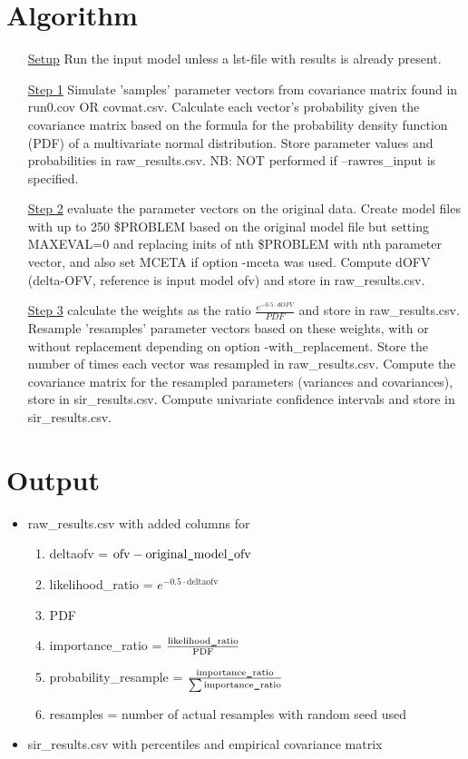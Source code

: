 \section{Algorithm}
\begin{itemize}
\item[\underline{Setup}] Run the input model unless a lst-file with results is already present.
\item[\underline{Step 1}] Simulate 'samples' parameter vectors from covariance matrix found in run0.cov OR covmat.csv. 
Calculate each vector’s probability given the covariance matrix based on the formula for the probability 
density function (PDF) of a multivariate normal distribution. Store parameter values and probabilities in raw\_results.csv.
NB: NOT performed if –rawres\_input is specified.
\item[\underline{Step 2}] evaluate the parameter vectors on the original data.
Create model files with up to 250 \$PROBLEM based on the original model file but setting MAXEVAL=0
and replacing inits of nth \$PROBLEM with nth parameter vector, and also set MCETA if option -mceta was used. Compute dOFV 
(delta-OFV, reference is input model ofv) and store in raw\_results.csv.
\item[\underline{Step 3}] calculate the weights as the ratio $\frac{e^{-0.5\cdot dOFV}}{PDF}$ and store in raw\_results.csv. 
Resample 'resamples' parameter vectors based on these weights, with or without replacement depending on option -with\_replacement. 
Store the number of times each vector was resampled in raw\_results.csv.
Compute the covariance matrix for the resampled parameters (variances and covariances), 
store in sir\_results.csv. 
Compute univariate confidence intervals and store in sir\_results.csv.
\end{itemize}

\section{Output}
\begin{itemize}
\item raw\_results.csv with added columns for
\begin{enumerate}
\item deltaofv = $\mathrm{ofv} - \mathrm{original}\mbox{\tt\string_}\mathrm{model}\mbox{\tt\string_}\mathrm{ofv}$
\item likelihood\_ratio = $e^{-0.5\cdot \mathrm{deltaofv}}$
\item PDF
\item importance\_ratio = $\frac{\mathrm{likelihood}\mbox{\tt\string_}\mathrm{ratio}}{\mathrm{PDF}}$
\item probability\_resample = $\frac{\mathrm{importance}\mbox{\tt\string_}\mathrm{ratio}}{\sum{\mathrm{importance}\mbox{\tt\string_}\mathrm{ratio}}}$
\item resamples = number of actual resamples with random seed used
\end{enumerate}
\item sir\_results.csv with percentiles and empirical covariance matrix
\end{itemize}


